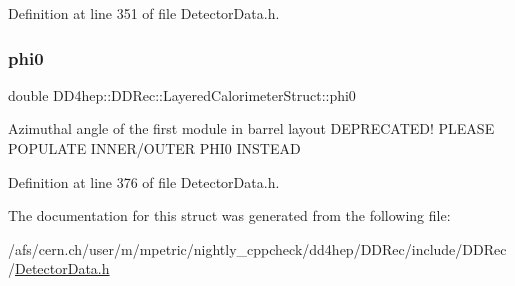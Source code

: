 Definition at line 351 of file Detector\+Data.\+h.

\hypertarget{struct_d_d4hep_1_1_d_d_rec_1_1_layered_calorimeter_struct_a1c5124161001b81077ce44414cfe046d}{}\label{struct_d_d4hep_1_1_d_d_rec_1_1_layered_calorimeter_struct_a1c5124161001b81077ce44414cfe046d} 
\subsubsection{\texorpdfstring{phi0}{phi0}}
{\footnotesize\ttfamily double D\+D4hep\+::\+D\+D\+Rec\+::\+Layered\+Calorimeter\+Struct\+::phi0}

Azimuthal angle of the first module in barrel layout D\+E\+P\+R\+E\+C\+A\+T\+E\+D! P\+L\+E\+A\+SE P\+O\+P\+U\+L\+A\+TE I\+N\+N\+E\+R/\+O\+U\+T\+ER P\+H\+I0 I\+N\+S\+T\+E\+AD 

Definition at line 376 of file Detector\+Data.\+h.



The documentation for this struct was generated from the following file\+:\begin{DoxyCompactItemize}
\item 
/afs/cern.\+ch/user/m/mpetric/nightly\+\_\+cppcheck/dd4hep/\+D\+D\+Rec/include/\+D\+D\+Rec/\hyperlink{_detector_data_8h}{Detector\+Data.\+h}\end{DoxyCompactItemize}
